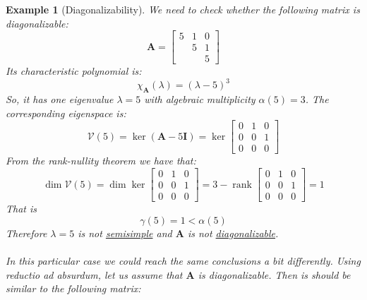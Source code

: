\documentclass[a4paper,10pt,oneside]{book}
\newtheorem{example}{Example}
\begin{document}
\begin{example}[Diagonalizability]
 We need to check whether the following matrix is diagonalizable:
\begin{equation}
 \mathbf{A}=\left[ {\begin{array}{ccc}
 5 & 1 & 0\\
   & 5 & 1\\
   &   & 5
 \end{array} } \right]
\end{equation}
Its characteristic polynomial is:
\begin{equation}
 \chi_{\mathbf{A}}(\lambda)=(\lambda-5)^3
\end{equation}
So, it has one eigenvalue $\lambda=5$ with algebraic multiplicity $\alpha(5)=3$. The corresponding eigenspace is:
\begin{equation}
 \mathcal{V}(5)=\operatorname{ker}(\mathbf{A}-5\mathbf{I})=\operatorname{ker}\left[ {\begin{array}{ccc}
 0 & 1 & 0\\
 0 & 0 & 1\\
 0 & 0 & 0
 \end{array} } \right]
\end{equation}
From the rank-nullity theorem we have that:
\begin{equation}
 \operatorname{dim}\mathcal{V}(5)=\operatorname{dim} \operatorname{ker}\left[ {\begin{array}{ccc}
 0 & 1 & 0\\
 0 & 0 & 1\\
 0 & 0 & 0
 \end{array} } \right]=3-\operatorname{rank}\left[ {\begin{array}{ccc}
 0 & 1 & 0\\
 0 & 0 & 1\\
 0 & 0 & 0
 \end{array} } \right]=1
\end{equation}
That is
\begin{equation}
 \gamma(5)=1 < \alpha(5)
\end{equation}
Therefore $\lambda=5$ is not \hyperlink{def:semisimpleEigenvalue}{semisimple} and $\mathbf{A}$ is not \hyperlink{theorem:spectralDecomp}{diagonalizable}.\\
\\
In this particular case we could reach the same conclusions a bit differently.
Using \textit{reductio ad absurdum}, let us assume that $\mathbf{A}$ is diagonalizable. Then is should be similar to the following matrix:
\begin{equation}

\end{equation}
\end{example}
\end{document}
